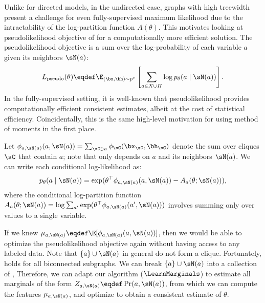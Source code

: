 Unlike for directed models, in the undirected case,
graphs with high treewidth present a challenge
for even fully-supervised maximum likelihood due to the intractability of the log-partition function $A(\theta)$.
This motivates looking at pseudolikelihood objective of \citep{besag75pseudo} for a computationally more
efficient solution.
The pseudolikelihood objective is a sum over the log-probability of each variable $a$ given its neighbors $\sN(a)$:
\begin{align}
  \label{eqn:pseudolikelihood}
L_\text{pseudo}(\theta) \eqdef \E_{(\bx,\bh) \sim p^*}\left[\sum_{a \in X \cup H} \log p_\theta(a \mid \sN(a))\right].
\end{align}
In the fully-supervised setting, it is well-known that pseudolikelihood provides computationally efficient consistent estimates,
albeit at the cost of statistical efficiency.
Coincidentally, this is the same high-level motivation for using method of moments in the first place.

Let $\phi_{a,\sN(a)}(a, \sN(a)) = \sum_{\sC \ni a} \phi_\sC(\bx_\sC,\bh_\sC)$
denote the sum over cliques $\sC$ that contain $a$; note that only depends on $a$ and its neighbors $\sN(a)$.
We can write each conditional log-likelihood as:
\begin{align}
p_\theta(a \mid \sN(a)) = \exp(\theta^\top\phi_{a,\sN(a)}(a, \sN(a)) - A_a(\theta; \sN(a))),
\end{align}
where the conditional log-partition function $A_a(\theta; \sN(a)) = \log \sum_{a'} \exp(\theta^\top\phi_{a,\sN(a)}(a', \sN(a)))$
involves summing only over values to a single variable.

If we knew $\mu_{a,\sN(a)} \eqdef \E[\phi_{a,\sN(a)}(a,\sN(a))]$,
then we would be able to optimize the pseudolikelihood objective again without
having access to any labeled data.
Note that $\{a\}\cup\sN(a)$ in general do not form a clique.
Fortunately,  holds for all biconnected subgraphs.
We can break $\{a\}\cup\sN(a)$ into a collection of 
  ,
  Therefore, we can adapt our algorithm ($\LearnMarginals$) to estimate all marginals of the form $Z_{a,\sN(a)} \eqdef \Pr(a,\sN(a))$,
  from which we can compute the features $\mu_{a,\sN(a)}$,
  and optimize  to obtain a consistent estimate of $\theta$.

